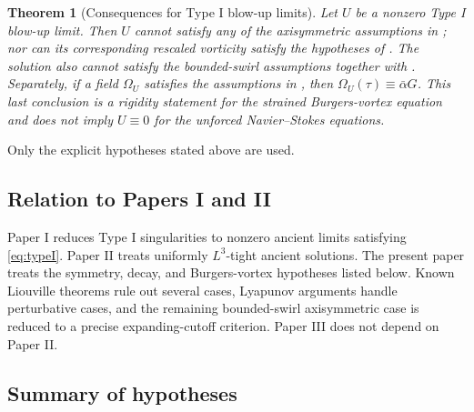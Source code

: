 \documentclass[11pt]{amsart}
\theoremstyle{plain}
\newtheorem{theorem}{Theorem}[section]
\theoremstyle{definition}
\theoremstyle{remark}
\numberwithin{equation}{section}
\begin{document}
\begin{theorem}[Consequences for Type I blow-up limits]
\label{thm:typeI-consequences}
Let \(U\) be a nonzero Type I blow-up limit.  Then \(U\) cannot satisfy any of
the axisymmetric assumptions in ; nor can its
corresponding rescaled vorticity satisfy the hypotheses of
.  The solution also cannot
satisfy the bounded-swirl assumptions together with .
Separately, if a field \(\Omega_U\) satisfies the assumptions in
, then \(\Omega_U(\tau)\equiv\bar\alpha G\).  This
last conclusion is a rigidity statement for the strained Burgers-vortex
equation and does not imply \(U\equiv0\) for the unforced
Navier--Stokes equations.
\end{theorem}

Only the explicit hypotheses stated above are used.

\subsection{Relation to Papers I and II}

Paper I \cite{DuranPaperI} reduces Type I singularities to nonzero ancient
limits satisfying \eqref{eq:typeI}.  Paper II \cite{DuranPaperII} treats
uniformly \(L^3\)-tight ancient solutions.  The present paper treats the
symmetry, decay, and Burgers-vortex hypotheses listed below.  Known Liouville
theorems rule out several cases, Lyapunov arguments handle perturbative cases,
and the remaining bounded-swirl axisymmetric case is reduced to a precise
expanding-cutoff criterion.
Paper III does not depend on Paper II.

\subsection{Summary of hypotheses}
\end{document}
